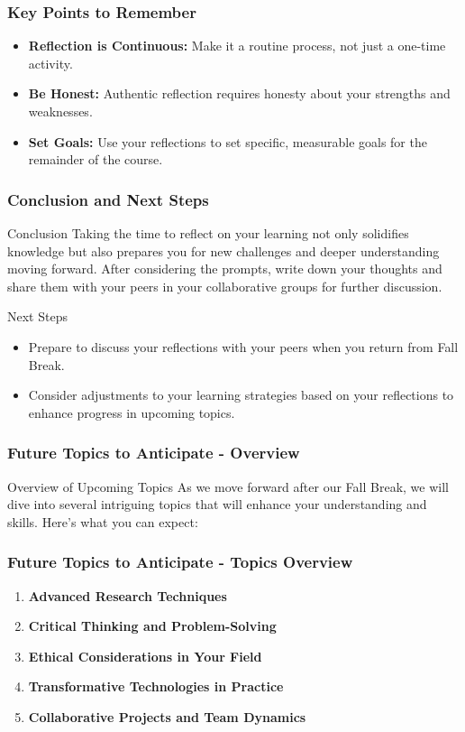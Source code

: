\documentclass[aspectratio=169]{beamer}
\begin{document}
\begin{frame}[fragile]
    \frametitle{Key Points to Remember}
    \begin{itemize}
        \item \textbf{Reflection is Continuous:} Make it a routine process, not just a one-time activity.
        \item \textbf{Be Honest:} Authentic reflection requires honesty about your strengths and weaknesses.
        \item \textbf{Set Goals:} Use your reflections to set specific, measurable goals for the remainder of the course.
    \end{itemize}
\end{frame}

\begin{frame}[fragile]
    \frametitle{Conclusion and Next Steps}
    \begin{block}{Conclusion}
        Taking the time to reflect on your learning not only solidifies knowledge but also prepares you for new challenges and deeper understanding moving forward. After considering the prompts, write down your thoughts and share them with your peers in your collaborative groups for further discussion.
    \end{block}

    \begin{block}{Next Steps}
        \begin{itemize}
            \item Prepare to discuss your reflections with your peers when you return from Fall Break.
            \item Consider adjustments to your learning strategies based on your reflections to enhance progress in upcoming topics.
        \end{itemize}
    \end{block}
\end{frame}

\begin{frame}[fragile]
    \frametitle{Future Topics to Anticipate - Overview}
    \begin{block}{Overview of Upcoming Topics}
        As we move forward after our Fall Break, we will dive into several intriguing topics that will enhance your understanding and skills. Here’s what you can expect:
    \end{block}
\end{frame}

\begin{frame}[fragile]
    \frametitle{Future Topics to Anticipate - Topics Overview}
    \begin{enumerate}
        \item \textbf{Advanced Research Techniques}
        \item \textbf{Critical Thinking and Problem-Solving}
        \item \textbf{Ethical Considerations in Your Field}
        \item \textbf{Transformative Technologies in Practice}
        \item \textbf{Collaborative Projects and Team Dynamics}
    \end{enumerate}
\end{frame}
\end{document}
